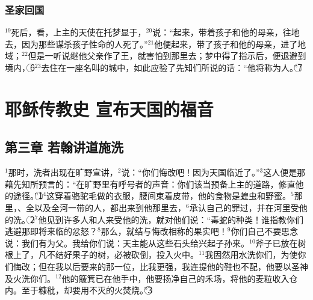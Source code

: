 \subsubsection{圣家回国}
$^{19}$\UL[黑落德]死后，看，上主的天使在\UL[埃及]托梦显于\UL[若瑟]，$^{20}$说：“起来，带着孩子和他的母亲，往\UL[以色列]地去，因为那些谋杀孩子性命的人死了。”$^{21}$他便起来，带了孩子和他的母亲，进了\UL[以色列]地域；$^{22}$但是一听说\UL[阿尔赫劳]继他父亲\UL[黑落德]作了\UL[犹太]王，就害怕到那里去；梦中得了指示后，便退避到\UL[加里肋亚]境内，\textcircled{6}$^{23}$去住在一座名叫\UL[纳匝肋]的城中，如此应验了先知们所说的话：“他将称为\UL[纳匝肋]人。”\textcircled{7}


\section{耶稣传教史 宣布天国的福音}


\subsection{第三章 若翰讲道施洗}
$^{1}$那时，洗者\UL[若翰]出现在\UL[犹太]旷野宣讲，$^{2}$说：“你们悔改吧！因为天国临近了。”$^{3}$这人便是那藉\UL[依撒意亚]先知所预言的：“在旷野里有呼号者的声音：你们该当预备上主的道路，修直他的途径。”\textcircled{1}$^{4}$这\UL[若翰]穿着骆驼毛做的衣服，腰间束着皮带，他的食物是蝗虫和野蜜。$^{5}$那里，\UL[耶路撒冷]、全\UL[犹太]以及全\UL[约旦]河一带的人，都出来到他那里去，$^{6}$承认自己的罪过，并在\UL[约但]河里受他的洗。\textcircled{2}$^{7}$他见到许多\UL[法利塞]人和\UL[撒杜塞]人来受他的洗，就对他们说：“毒蛇的种类！谁指教你们逃避那即将来临的忿怒？$^{8}$那么，就结与悔改相称的果实吧！$^{9}$你们自己不要思念说：我们有\UL[亚巴郎]为父。我给你们说：天主能从这些石头给\UL[亚巴郎]兴起子孙来。$^{10}$斧子已放在树根上了，凡不结好果子的树，必被砍倒，投入火中。$^{11}$我固然用水洗你们，为使你们悔改；但在我以后要来的那一位，比我更强，我连提他的鞋也不配，他要以圣神及火洗你们。$^{12}$他的簸箕已在他手中，他要扬净自己的禾场，将他的麦粒收入仓内。至于糠秕，却要用不灭的火焚烧。”\textcircled{3}


